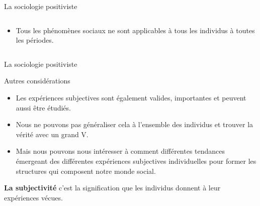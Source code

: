 \documentclass[10pt]{beamer}
\begin{document}
\begin{frame}{La sociologie positiviste}
    \begin{columns}
        \begin{column}{0.8\textwidth}
    \begin{itemize}
        \item Tous les phénomènes sociaux ne sont applicables à tous les individus à toutes les périodes.
    \end{itemize}
        \end{column}
    \end{columns}
\end{frame}

\begin{frame}{La sociologie positiviste}
    \begin{block}{Autres considérations}
    \end{block}
    \begin{itemize}
        \item Les expériences subjectives sont également valides, importantes et peuvent aussi être étudiés.
        \item Nous ne pouvons pas généraliser cela à l'ensemble des individus et trouver la vérité avec un grand V.
        \item Mais nous pouvons nous intéresser à comment différentes tendances émergeant des différentes expériences subjectives individuelles pour former les structures qui composent notre monde social.
    \end{itemize}

\textbf{La subjectivité} c'est la signification que les individus donnent à leur expériences vécues.

\end{frame}
\end{document}
